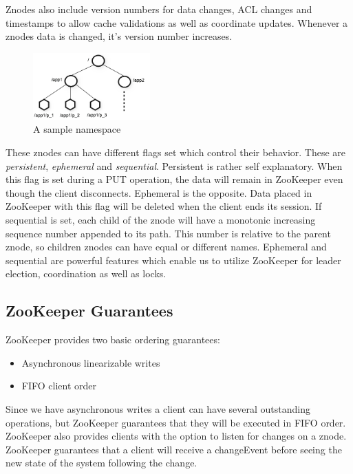 Znodes also include version numbers for data changes, ACL changes and timestamps to allow cache validations as well as coordinate updates. Whenever a znodes data is changed, it's version number increases.

\begin{figure}[h]
    \centering
    \includegraphics[width=0.4\textwidth]{software/zknamespace.jpg}
    \caption{A sample namespace}
    \label{fig:zk_namespace}
\end{figure}

These znodes can have different flags set which control their behavior. These are \emph{persistent}, \emph{ephemeral} and \emph{sequential}. Persistent is rather self explanatory. When this flag is set during a PUT operation, the data will remain in ZooKeeper even though the client disconnects. Ephemeral is the opposite. Data placed in ZooKeeper with this flag will be deleted when the client ends its session. If sequential is set, each child of the znode will have a monotonic increasing sequence number appended to its path. This number is relative to the parent znode, so children znodes can have equal or different names. Ephemeral and sequential are powerful features which enable us to utilize ZooKeeper for leader election, coordination as well as locks. 

\subsection{ZooKeeper Guarantees}
ZooKeeper provides two basic ordering guarantees:

\begin{itemize}
	\item Asynchronous linearizable writes
 	\item FIFO client order
\end{itemize}

Since we have asynchronous writes a client can have several outstanding operations, but ZooKeeper guarantees that they will be executed in FIFO order. ZooKeeper also provides clients with the option to listen for changes on a znode. ZooKeeper guarantees that a client will receive a changeEvent before seeing the new state of the system following the change. 

